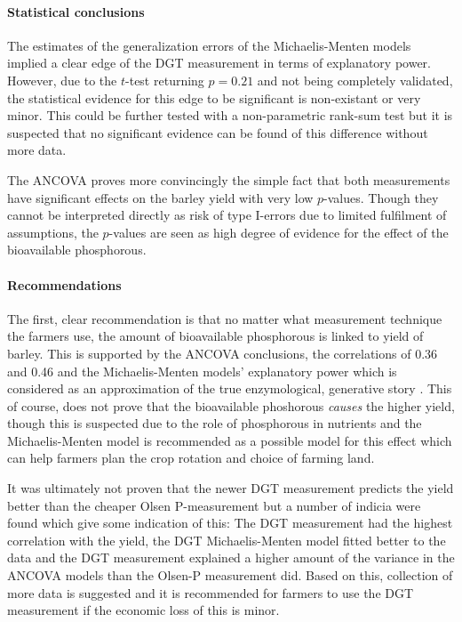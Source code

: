 \documentclass[11pt,fleqn]{article}
\begin{document}
\paragraph{Statistical conclusions} The estimates of the generalization errors of the Michaelis-Menten models implied a clear edge of the DGT measurement in terms of explanatory power. 
However, due to the \(t\)-test returning \(p=0.21\) and not being completely validated, the statistical evidence for this edge to be significant is non-existant or very minor. This could be further tested with a non-parametric rank-sum test but it is suspected that no significant evidence can be found of this difference without more data.

The ANCOVA proves more convincingly the simple fact that both measurements have significant effects on the barley yield with very low \(p\)-values. 
Though they cannot be interpreted directly as risk of type I-errors due to limited fulfilment of assumptions, the \(p\)-values are seen as high degree of evidence for the effect of the bioavailable phosphorous.

\paragraph{Recommendations} The first, clear recommendation is that no matter what measurement technique the farmers use, the amount of bioavailable phosphorous is linked to yield of barley. 
This is supported by the ANCOVA conclusions, the correlations of 0.36 and 0.46 and the Michaelis-Menten models' explanatory power which is considered as an approximation of the true enzymological, generative story \cite{michment}. 
This of course, does not prove that the bioavailable phoshorous \textit{causes} the higher yield, though this is suspected due to the role of phosphorous in nutrients and the Michaelis-Menten model is recommended as a possible model for this effect which can help farmers plan the crop rotation and choice of farming land.

It was ultimately not proven that the newer DGT measurement predicts the yield better than the cheaper Olsen P-measurement but a number of indicia were found which give some indication of this: The DGT measurement had the highest correlation with the yield, the DGT Michaelis-Menten model fitted better to the data and the DGT measurement explained a higher amount of the variance in the ANCOVA models than the Olsen-P measurement did.
Based on this, collection of more data is suggested and it is recommended for farmers to use the DGT measurement if the economic loss of this is minor. 
\end{document}
